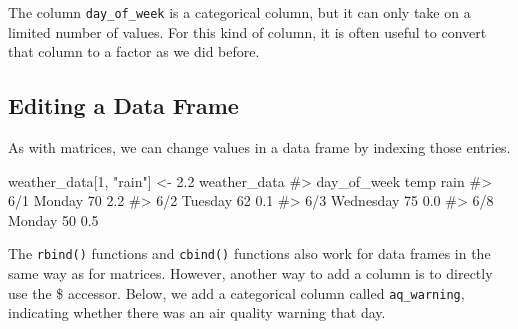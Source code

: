 \documentclass[
  letterpaper,
]{krantz}
\makeatletter
\newenvironment{Shaded}{\begin{snugshade}}{\end{snugshade}}
\newcommand{\CommentTok}[1]{\textcolor[rgb]{0.37,0.37,0.37}{#1}}
\newcommand{\DecValTok}[1]{\textcolor[rgb]{0.68,0.00,0.00}{#1}}
\newcommand{\FloatTok}[1]{\textcolor[rgb]{0.68,0.00,0.00}{#1}}
\newcommand{\FunctionTok}[1]{\textcolor[rgb]{0.28,0.35,0.67}{#1}}
\newcommand{\NormalTok}[1]{\textcolor[rgb]{0.00,0.23,0.31}{#1}}
\newcommand{\OtherTok}[1]{\textcolor[rgb]{0.00,0.23,0.31}{#1}}
\newcommand{\SpecialCharTok}[1]{\textcolor[rgb]{0.37,0.37,0.37}{#1}}
\newcommand{\StringTok}[1]{\textcolor[rgb]{0.13,0.47,0.30}{#1}}
\newenvironment{kframe}{%
\medskip{}
\setlength{\fboxsep}{.8em}
 \def\at@end@of@kframe{}%
 \ifinner\ifhmode%
  \def\at@end@of@kframe{\end{minipage}}%
  \begin{minipage}{\columnwidth}%
 \fi\fi%
 \def\FrameCommand##1{\hskip\@totalleftmargin \hskip-\fboxsep
 \colorbox{shadecolor}{##1}\hskip-\fboxsep
     \hskip-\linewidth \hskip-\@totalleftmargin \hskip\columnwidth}%
 \MakeFramed {\advance\hsize-\width
   \@totalleftmargin\z@ \linewidth\hsize
   \@setminipage}}%
 {\par\unskip\endMakeFramed%
 \at@end@of@kframe}
\renewenvironment{Shaded}{\begin{kframe}}{\end{kframe}}
\makeatother
\begin{document}
The column \texttt{day\_of\_week} is a categorical column, but it can
only take on a limited number of values. For this kind of column, it is
often useful to convert that column to a factor as we did before.

\begin{Shaded}
\end{Shaded}

\hypertarget{editing-a-data-frame}{%
\subsection{Editing a Data Frame}\label{editing-a-data-frame}}

As with matrices, we can change values in a data frame by indexing those
entries.

\begin{Shaded}
\begin{Highlighting}[]
\NormalTok{weather\_data[}\DecValTok{1}\NormalTok{, }\StringTok{"rain"}\NormalTok{] }\OtherTok{\textless{}{-}} \FloatTok{2.2}
\NormalTok{weather\_data}
\CommentTok{\#\textgreater{}     day\_of\_week temp rain}
\CommentTok{\#\textgreater{} 6/1      Monday   70  2.2}
\CommentTok{\#\textgreater{} 6/2     Tuesday   62  0.1}
\CommentTok{\#\textgreater{} 6/3   Wednesday   75  0.0}
\CommentTok{\#\textgreater{} 6/8      Monday   50  0.5}
\end{Highlighting}
\end{Shaded}

The \texttt{rbind()} functions and \texttt{cbind()} functions also work
for data frames in the same way as for matrices. However, another way to
add a column is to directly use the \$ accessor. Below, we add a
categorical column called \texttt{aq\_warning}, indicating whether there
was an air quality warning that day.

\begin{Shaded}
\end{Shaded}
\end{document}
